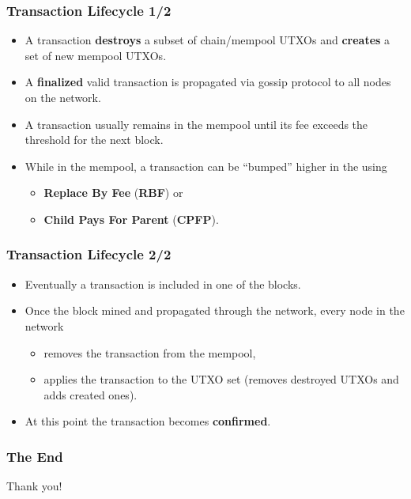 \documentclass{beamer}
\begin{document}
\begin{frame}
  \frametitle{Transaction Lifecycle 1/2}
  \begin{itemize}
  \item A transaction \textbf{destroys} a subset of chain/mempool UTXOs and
    \textbf{creates} a set of new mempool UTXOs.
  \item A \textbf{finalized} valid transaction is propagated via gossip protocol
    to all nodes on the network.
  \item A transaction usually remains in the mempool until its fee exceeds the
    threshold for the next block.
  \item While in the mempool, a transaction can be ``bumped'' higher in the
    using
    \begin{itemize}
    \item \textbf{Replace By Fee} (\textbf{RBF}) or
    \item \textbf{Child Pays For Parent} (\textbf{CPFP}).
    \end{itemize}
  \end{itemize}
\end{frame}

\begin{frame}
  \frametitle{Transaction Lifecycle 2/2}
  \begin{itemize}
  \item Eventually a transaction is included in one of the blocks.
  \item Once the block mined and propagated through the network, every node in
    the network
    \begin{itemize}
    \item removes the transaction from the mempool,
    \item applies the transaction to the UTXO set (removes destroyed UTXOs and
      adds created ones).
    \end{itemize}
  \item At this point the transaction becomes \textbf{confirmed}.
  \end{itemize}
\end{frame}

\begin{frame}
  \frametitle{The End}
  \begin{center}
    Thank you!
  \end{center}
\end{frame}
\end{document}
